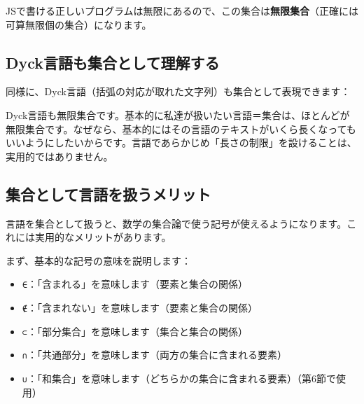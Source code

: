 JSで書ける正しいプログラムは無限にあるので、この集合は\textbf{無限集合}（正確には可算無限個の集合）になります。

\hypertarget{chapter4-dyckux8a00ux8a9eux3082ux96c6ux5408ux3068ux3057ux3066ux7406ux89e3ux3059ux308b}{%
\subsection{Dyck言語も集合として理解する}\label{chapter4-dyckux8a00ux8a9eux3082ux96c6ux5408ux3068ux3057ux3066ux7406ux89e3ux3059ux308b}}

同様に、Dyck言語（括弧の対応が取れた文字列）も集合として表現できます：

\begin{Shaded}
\begin{Highlighting}[]
\NormalTok{\}}
\end{Highlighting}
\end{Shaded}

Dyck言語も無限集合です。基本的に私達が扱いたい言語＝集合は、ほとんどが無限集合です。なぜなら、基本的にはその言語のテキストがいくら長くなってもいいようにしたいからです。言語であらかじめ「長さの制限」を設けることは、実用的ではありません。

\hypertarget{chapter4-ux96c6ux5408ux3068ux3057ux3066ux8a00ux8a9eux3092ux6271ux3046ux30e1ux30eaux30c3ux30c8}{%
\subsection{集合として言語を扱うメリット}\label{chapter4-ux96c6ux5408ux3068ux3057ux3066ux8a00ux8a9eux3092ux6271ux3046ux30e1ux30eaux30c3ux30c8}}

言語を集合として扱うと、数学の集合論で使う記号が使えるようになります。これには実用的なメリットがあります。

まず、基本的な記号の意味を説明します：

\begin{itemize}
\tightlist
\item
  \texttt{∈}：「含まれる」を意味します（要素と集合の関係）
\item
  \texttt{∉}：「含まれない」を意味します（要素と集合の関係）
\item
  \texttt{⊂}：「部分集合」を意味します（集合と集合の関係）
\item
  \texttt{∩}：「共通部分」を意味します（両方の集合に含まれる要素）
\item
  \texttt{∪}：「和集合」を意味します（どちらかの集合に含まれる要素）（第6節で使用）
\end{itemize}

